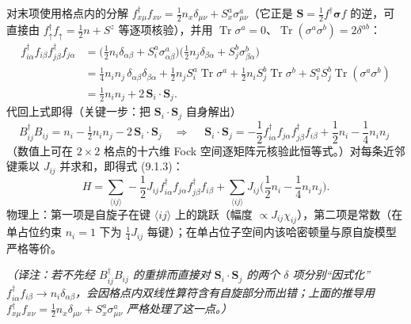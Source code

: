 对末项使用格点内的分解 $f^{\dagger}_{x\mu}f_{x\nu}=\frac12 n_x\delta_{\mu\nu}+S^a_x\sigma^a_{\mu\nu}$（它正是 $\pmb{S}=\frac12 f^{\dagger}\pmb{\sigma}f$ 的逆，可直接由 $f^{\dagger}_{\uparrow}f_{\uparrow}=\frac12 n+S^z$ 等逐项核验），并用 $\operatorname{Tr}\sigma^a=0$、$\operatorname{Tr}(\sigma^a\sigma^b)=2\delta^{ab}$：
\begin{align*}
f^{\dagger}_{i\alpha}f_{i\beta}f^{\dagger}_{j\beta}f_{j\alpha}
&=\Big(\tfrac12 n_i\delta_{\alpha\beta}+S^a_i\sigma^a_{\alpha\beta}\Big)
\Big(\tfrac12 n_j\delta_{\beta\alpha}+S^b_j\sigma^b_{\beta\alpha}\Big)\\
&=\tfrac14 n_in_j\,\delta_{\alpha\beta}\delta_{\beta\alpha}
+\tfrac12 n_j S^a_i\operatorname{Tr}\sigma^a
+\tfrac12 n_i S^b_j\operatorname{Tr}\sigma^b
+S^a_iS^b_j\operatorname{Tr}(\sigma^a\sigma^b)\\
&=\tfrac12 n_in_j+2\,\pmb{S}_i\cdot\pmb{S}_j .
\end{align*}
代回上式即得（关键一步：把 $\pmb{S}_i\cdot\pmb{S}_j$ 自身解出）
\begin{equation*}
B^{\dagger}_{ij}B_{ij}=n_i-\tfrac12 n_in_j-2\,\pmb{S}_i\cdot\pmb{S}_j
\quad\Longrightarrow\quad
\boxed{\;\pmb{S}_i\cdot\pmb{S}_j=-\frac12 f^{\dagger}_{i\alpha}f_{j\alpha}f^{\dagger}_{j\beta}f_{i\beta}+\frac12 n_i-\frac14 n_in_j\;}
\end{equation*}
（数值上可在 $2\times2$ 格点的十六维 Fock 空间逐矩阵元核验此恒等式。）对每条近邻键乘以 $J_{ij}$ 并求和，即得式 (9.1.3)：
\begin{equation*}
H=\sum_{\langle ij\rangle}-\frac12 J_{ij}f^{\dagger}_{i\alpha}f_{j\alpha}f^{\dagger}_{j\beta}f_{i\beta}
+\sum_{\langle ij\rangle}J_{ij}\Big(\frac12 n_i-\frac14 n_in_j\Big).
\end{equation*}
物理上：第一项是自旋子在键 $\langle ij\rangle$ 上的跳跃（幅度 $\propto J_{ij}\chi_{ij}$），第二项是常数（在单占位约束 $n_i=1$ 下为 $\frac14J_{ij}$ 每键）；在单占位子空间内该哈密顿量与原自旋模型严格等价。

\emph{（译注：若不先经 $B^{\dagger}_{ij}B_{ij}$ 的重排而直接对 $\pmb{S}_i\cdot\pmb{S}_j$ 的两个 $\delta$ 项分别“因式化” $f^{\dagger}_{i\alpha}f_{i\beta}\to n_i\delta_{\alpha\beta}$，会因格点内双线性算符含有自旋部分而出错；上面的推导用 $f^{\dagger}_{x\mu}f_{x\nu}=\frac12n_x\delta_{\mu\nu}+S^a_x\sigma^a_{\mu\nu}$ 严格处理了这一点。）}

